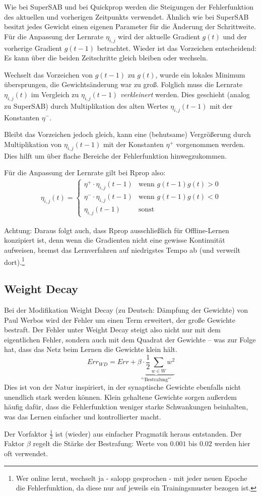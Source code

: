 Wie bei SuperSAB und bei Quickprop werden die Steigungen der Fehlerfunktion des aktuellen und vorherigen Zeitpunkts verwendet.
Ähnlich wie bei SuperSAB besitzt jedes Gewicht einen eigenen Parameter für die Änderung der Schrittweite.
Für die Anpassung der Lernrate $\eta_{i,j}$ wird der aktuelle Gradient $g(t)$ und der vorherige Gradient $g(t-1)$ betrachtet. Wieder ist das Vorzeichen entscheidend: Es kann über die beiden Zeitschritte gleich bleiben oder wechseln.

Wechselt das Vorzeichen von $g(t-1)$ zu $g(t)$, wurde ein lokales Minimum übersprungen, die Gewichtsänderung war zu groß.
Folglich muss die Lernrate $\eta_{i,j}(t)$ im Vergleich zu $\eta_{i,j}(t-1)$ \emph{verkleinert} werden. Dies geschieht (analog zu SuperSAB) durch Multiplikation des alten Wertes $\eta_{i,j}(t-1)$ mit der Konstanten $\eta^-$.

Bleibt das Vorzeichen jedoch gleich, kann eine (behutsame) Vergrößerung durch Multiplikation von $\eta_{i,j}(t-1)$ mit der Konstanten $\eta^+$ vorgenommen werden. Dies hilft um über flache Bereiche der Fehlerfunktion hinwegzukommen.

Für die Anpassung der Lernrate gilt bei Rprop also:
\begin{align*}
	\eta_{i,j}(t) = 
	\begin{cases}
		\eta^+ \cdot \eta_{i,j}(t-1)	&\text{wenn }
			g(t-1)g(t) > 0 \\
		\eta^- \cdot \eta_{i,j}(t-1)	&\text{wenn }
			g(t-1)g(t) < 0 \\
		\eta_{i,j}(t-1)					&\text{sonst }
	\end{cases}
\end{align*}

Achtung: Daraus folgt auch, dass Rprop ausschließlich für Offline-Lernen konzipiert ist, denn wenn die Gradienten nicht eine gewisse Kontinuität aufweisen, bremst das Lernverfahren auf niedrigstes Tempo ab (und verweilt dort).\footnote{Wer online lernt, wechselt ja - salopp gesprochen - mit jeder neuen Epoche die Fehlerfunktion, da diese nur auf jeweils ein Trainingsmuster bezogen ist.}

\subsection*{Weight Decay}
Bei der Modifikation Weight Decay (zu Deutsch: Dämpfung der Gewichte) von Paul Werbos wird der Fehler um einen Term erweitert, der große Gewichte bestraft. Der Fehler unter Weight Decay steigt also nicht nur mit dem eigentlichen Fehler, sondern auch mit dem Quadrat der Gewichte – was zur Folge hat, dass das Netz beim Lernen die Gewichte klein hält.
\[
	Err_{WD} = Err + 
		\underbrace{ \beta \cdot \frac{1}{2} \sum_{w \in W} w^2 }_
		{\text{"`Bestrafung"'}}
\]
Dies ist von der Natur inspiriert, in der synaptische Gewichte ebenfalls nicht unendlich stark werden können. Klein gehaltene Gewichte sorgen außerdem häufig dafür, dass die Fehlerfunktion weniger starke Schwankungen beinhalten, was das Lernen einfacher und kontrollierter macht.

Der Vorfaktor $\frac{1}{2}$ ist (wieder) aus einfacher Pragmatik heraus entstanden. Der Faktor $\beta$ regelt die Stärke der Bestrafung: Werte von $0.001$ bis $0.02$ werden hier oft verwendet.



